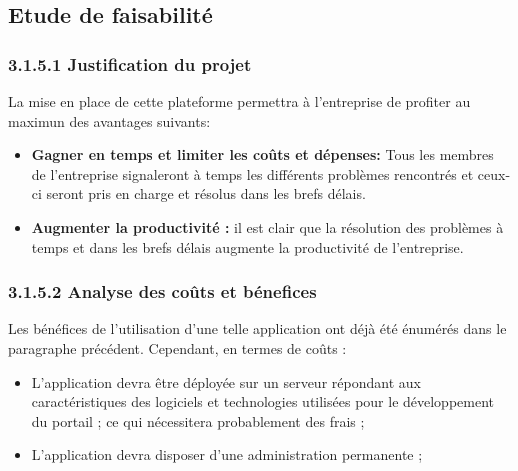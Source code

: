 \documentclass[14pt,A4,french,oneside,leqno]{report}
\begin{document}
\subsection{Etude de faisabilité}
   \subsubsection{3.1.5.1 Justification du projet}
   \textrm{La mise en place de cette plateforme permettra à l'entreprise de profiter au maximun des avantages suivants:\\}
   
   \begin{itemize}
   	\item [\checkmark] \textbf{Gagner en temps et limiter les coûts et dépenses:} Tous les membres de
l’entreprise signaleront à temps les différents problèmes rencontrés et ceux-ci
seront pris en charge et résolus dans les brefs délais. \\ 
   \end{itemize}

\begin{itemize}
	\item [\checkmark] \textbf{Augmenter la productivité :} il est clair que la résolution des problèmes à temps
et dans les brefs délais augmente la productivité de l’entreprise.\\
\end{itemize}

	\subsubsection{3.1.5.2  Analyse des coûts et bénefices}
	\textrm{Les bénéfices de l’utilisation d’une telle application ont déjà été énumérés dans le
paragraphe précédent. Cependant, en termes de coûts :}\\
\begin{itemize}
	\item [\checkmark] L’application devra être déployée sur un serveur répondant aux caractéristiques
des logiciels et technologies utilisées pour le développement du portail ; ce qui nécessitera probablement des frais ;\\
\end{itemize}

\begin{itemize}
	\item [\checkmark] L’application devra disposer d’une administration permanente ;\\
\end{itemize}
\end{document}

